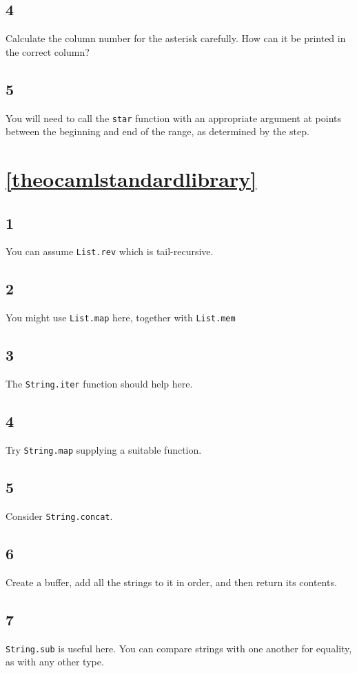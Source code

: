 \documentclass[]{book}
\begin{document}
\subsection*{4}
Calculate the column number for the asterisk carefully. How can it be printed in the correct column?

\subsection*{5}
You will need to call the \texttt{star} function with an appropriate argument at points between the beginning and end of the range, as determined by the step.

\section*{\ref{theocamlstandardlibrary}\\ }
\subsection*{1}You can assume \texttt{List.rev} which is tail-recursive.
\subsection*{2}You might use \texttt{List.map} here, together with \texttt{List.mem}
\subsection*{3}The \texttt{String.iter} function should help here.
\subsection*{4}Try \texttt{String.map} supplying a suitable function.
\subsection*{5}Consider \texttt{String.concat}.
\subsection*{6}Create a buffer, add all the strings to it in order, and then return its contents.
\subsection*{7}\texttt{String.sub} is useful here. You can compare strings with one another for equality, as with any other type.
\end{document}
